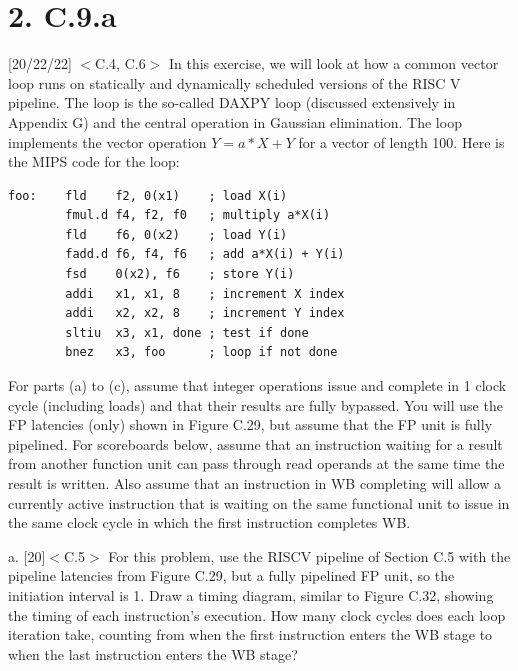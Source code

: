 \documentclass[11pt]{article}
\begin{document}
\section*{2. C.9.a}

[20/22/22] $<$C.4, C.6$>$ In this exercise, we will look at how a common vector loop runs on statically and dynamically scheduled versions of the RISC V pipeline. The loop is the so-called DAXPY loop (discussed extensively in Appendix G) and the central operation in Gaussian elimination. The loop implements the vector operation $Y=a*X+Y$ for a vector of length 100. Here is the MIPS code for the loop:

\begin{verbatim}
foo:    fld    f2, 0(x1)    ; load X(i)
        fmul.d f4, f2, f0   ; multiply a*X(i)
        fld    f6, 0(x2)    ; load Y(i)
        fadd.d f6, f4, f6   ; add a*X(i) + Y(i)
        fsd    0(x2), f6    ; store Y(i)
        addi   x1, x1, 8    ; increment X index
        addi   x2, x2, 8    ; increment Y index
        sltiu  x3, x1, done ; test if done
        bnez   x3, foo      ; loop if not done
\end{verbatim}

For parts (a) to (c), assume that integer operations issue and complete in 1 clock cycle (including loads) and that their results are fully bypassed. You will use the FP latencies (only) shown in Figure C.29, but assume that the FP unit is fully pipelined. For scoreboards below, assume that an instruction waiting for a result from another function unit can pass through read operands at the same time the result is written. Also assume that an instruction in WB completing will allow a currently active instruction that is waiting on the same functional unit to issue in the same clock cycle in which the first instruction completes WB.

a. [20]$<$C.5$>$ For this problem, use the RISCV pipeline of Section C.5 with the pipeline latencies from Figure C.29, but a fully pipelined FP unit, so the initiation interval is 1. Draw a timing diagram, similar to Figure C.32, showing the timing of each instruction's execution. How many clock cycles does each loop iteration take, counting from when the first instruction enters the WB stage to when the last instruction enters the WB stage?
\newpage
 
\end{document}
